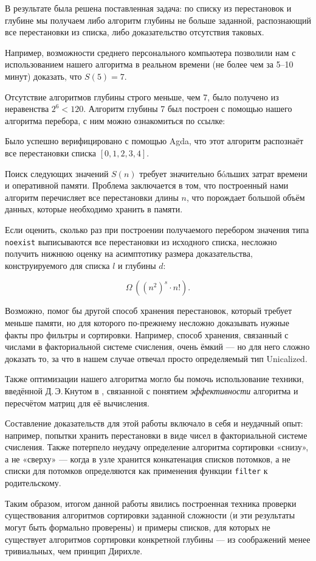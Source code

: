 
В результате была решена поставленная задача: по списку из перестановок и глубине мы получаем либо алгоритм глубины не больше заданной, распознающий все перестановки из списка, либо доказательство отсутствия таковых.

\abz Например, возможности среднего персонального компьютера позволили нам с использованием нашего алгоритма в реальном времени (не более чем за 5–10 минут) доказать, что $S(5) = 7$.

\abz Отсутствие алгоритмов глубины строго меньше, чем 7, было получено из неравенства $2^6 < 120$. Алгоритм глубины 7 был построен с помощью нашего алгоритма перебора, с ним можно ознакомиться по ссылке:


\abz Было успешно верифицировано с помощью Agda, что этот алгоритм распознаёт все перестановки списка $[0,1,2,3,4]$.

\abz Поиск следующих значений $S(n)$ требует значительно б\'oльших затрат времени и оперативной памяти. Проблема заключается в том, что построенный нами алгоритм перечисляет все перестановки длины $n$, что порождает большой объём данных, которые необходимо хранить в памяти.

\abz Если оценить, сколько раз при построении получаемого перебором значения типа {\tt noexist} выписываются все перестановки из исходного списка, несложно получить нижнюю оценку на асимптотику размера доказательства, конструируемого для списка $l$ и глубины $d$:

$$\Omega\,((n^2)^s \cdot n!).$$

\abz Возможно, помог бы другой способ хранения перестановок, который требует меньше памяти, но для которого по-прежнему несложно доказывать нужные факты про фильтры и сортировки. Например, способ хранения, связанный с числами в факториальной системе счисления, очень ёмкий — но для него сложно доказать то, за что в нашем случае отвечал просто определяемый тип Unicalized.

\abz Также оптимизации нашего алгоритма могло бы помочь использование техники, введённой Д.\,Э.\,Кнутом в \cite{Knuth}, связанной с понятием {\it эффективности} алгоритма и пересчётом матриц для её вычисления.

\abz Составление доказательств для этой работы включало в себя и неудачный опыт: например, попытки хранить перестановки в виде чисел в факториальной системе счисления. Также потерпело неудачу определение алгоритма сортировки «снизу», а не «сверху» — когда в узле хранится конкатенация списков потомков, а не списки для потомков определяются как применения функции {\tt filter} к родительскому.

\abz Таким образом, итогом данной работы явились построенная техника проверки существования алгоритмов сортировки заданной сложности (и эти результаты могут быть формально проверены) и примеры списков, для которых не существует алгоритмов сортировки конкретной глубины — из соображений менее тривиальных, чем принцип Дирихле.